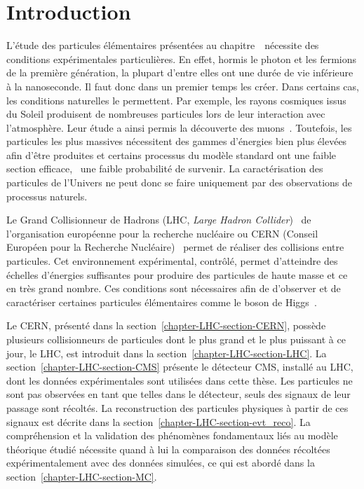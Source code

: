 \section{Introduction}\label{chapter-LHC-section-introduction}
L'étude des particules élémentaires présentées au chapitre~\ nécessite des conditions expérimentales particulières.
En effet,
hormis le photon et les fermions de la première génération,
la plupart d'entre elles ont une durée de vie inférieure à la nanoseconde.
Il faut donc dans un premier temps les créer.
Dans certains cas, les conditions naturelles le permettent.
Par exemple,
les rayons cosmiques issus du Soleil produisent de nombreuses particules lors de leur interaction avec l'atmosphère.
Leur étude a ainsi permis la découverte des muons~\cite{muon_discovery}.
Toutefois,
les particules les plus massives nécessitent des gammes d'énergies bien plus élevées afin d'être produites
et
certains processus du modèle standard ont une faible section efficace, \ie\ une faible probabilité de survenir.
La caractérisation des particules de l'Univers ne peut donc se faire uniquement par des observations de processus naturels.
\par Le Grand Collisionneur de Hadrons (LHC, \emph{Large Hadron Collider})~\cite{LHC_paper1,LHC_paper2,LHC_paper3} de l'organisation européenne pour la recherche nucléaire ou CERN (Conseil Européen pour la Recherche Nucléaire)~\cite{CERN_website} permet de réaliser des collisions entre particules.
Cet environnement expérimental, contrôlé, permet d'atteindre des échelles d'énergies suffisantes pour produire des particules de haute masse et ce en très grand nombre.
Ces conditions sont nécessaires afin de d'observer et de caractériser certaines particules élémentaires comme le boson de Higgs~\cite{ATLAS_Higgs_discovery,CMS_Higgs_discovery,CMS_Higgs_discovery_2013,ATLAS-CMS-Higgs_combined_1,ATLAS-CMS-Higgs_combined_2}.
\par Le CERN, présenté dans la section~\ref{chapter-LHC-section-CERN},
possède plusieurs collisionneurs de particules dont
le plus grand et le plus puissant à ce jour, le LHC, est introduit dans la section~\ref{chapter-LHC-section-LHC}.
La section~\ref{chapter-LHC-section-CMS} présente le détecteur CMS, installé au LHC, dont les données expérimentales sont utilisées dans cette thèse.
Les particules ne sont pas observées en tant que telles dans le détecteur,
seuls des signaux de leur passage sont récoltés.
La reconstruction des particules physiques à partir de ces signaux est décrite dans la section~\ref{chapter-LHC-section-evt_reco}.
La compréhension et la validation des phénomènes fondamentaux liés au modèle théorique étudié nécessite quand à lui la comparaison des données récoltées expérimentalement avec des données simulées, ce qui est abordé dans la section~\ref{chapter-LHC-section-MC}.